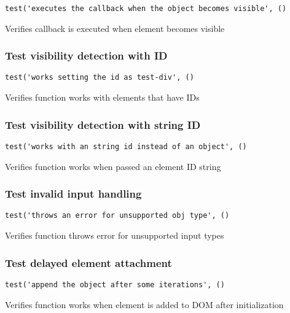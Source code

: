 \documentclass[a4paper]{article}
\begin{document}
\begin{lstlisting}
test('executes the callback when the object becomes visible', ()
\end{lstlisting}

Verifies callback is executed when element becomes visible

\hypertarget{toc59}{}
\subsubsection{Test visibility detection with ID}

\begin{lstlisting}
test('works setting the id as test-div', ()
\end{lstlisting}

Verifies function works with elements that have IDs

\hypertarget{toc60}{}
\subsubsection{Test visibility detection with string ID}

\begin{lstlisting}
test('works with an string id instead of an object', ()
\end{lstlisting}

Verifies function works when passed an element ID string

\hypertarget{toc61}{}
\subsubsection{Test invalid input handling}

\begin{lstlisting}
test('throws an error for unsupported obj type', ()
\end{lstlisting}

Verifies function throws error for unsupported input types

\hypertarget{toc62}{}
\subsubsection{Test delayed element attachment}

\begin{lstlisting}
test('append the object after some iterations', ()
\end{lstlisting}

Verifies function works when element is added to DOM after initialization
\end{document}
